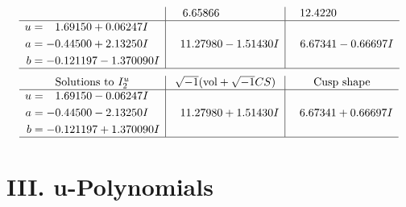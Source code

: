 \documentclass[1p]{elsarticle_modified}
\theoremstyle{definition}
\newcommand{\I}{\sqrt{-1}}
\begin{document}
$$\begin{array}{c|c|c}
 & \phantom{-}6.65866\phantom{ +0.000000I} & \phantom{-}12.4220\phantom{ +0.000000I} \\ \hline\begin{aligned}
u &= \phantom{-}1.69150 + 0.06247 I \\
a &= -0.44500 + 2.13250 I \\
b &= -0.121197 - 1.370090 I\end{aligned}
 & \phantom{-}11.27980 - 1.51430 I & \phantom{-}6.67341 - 0.66697 I\\
 \hline 
 \end{array}$$\newpage$$\begin{array}{c|c|c}  
\text{Solutions to }I^u_{2}& \I (\text{vol} + \sqrt{-1}CS) & \text{Cusp shape}\\
 \hline 
\begin{aligned}
u &= \phantom{-}1.69150 - 0.06247 I \\
a &= -0.44500 - 2.13250 I \\
b &= -0.121197 + 1.370090 I\end{aligned}
 & \phantom{-}11.27980 + 1.51430 I & \phantom{-}6.67341 + 0.66697 I\\
 \hline 
 \end{array}$$\newpage
\newpage\renewcommand{\arraystretch}{1}
\centering \section*{ III. u-Polynomials}
\end{document}

